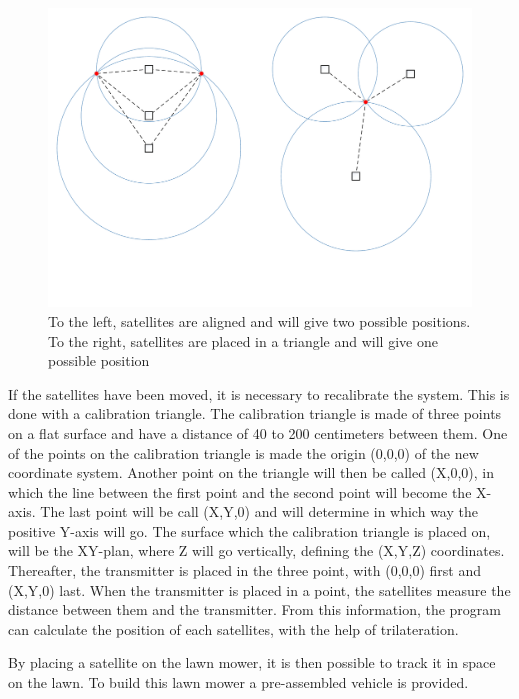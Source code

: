 \begin{figure}[H]
	\centering
	\includegraphics[scale=0.5]{figures/GoT_SingleVsTriangle.pdf}
	\caption{To the left, satellites are aligned and will give two possible positions. To the right, satellites are placed in a triangle and will give one possible position}
	\label{GoTTriVSLine}
\end{figure}
If the satellites have been moved, it is necessary to recalibrate the system. This is done with a calibration triangle. The calibration triangle is made of three points on a flat surface and have a distance of 40 to 200 centimeters between them. One of the points on the calibration triangle is made the origin (0,0,0) of the new coordinate system. Another point on the triangle will then be called (X,0,0), in which the line between the first point and the second point will become the X-axis. The last point will be call (X,Y,0) and will determine in which way the positive Y-axis will go. The surface which the calibration triangle is placed on, will be the XY-plan, where Z will go vertically, defining the (X,Y,Z) coordinates. Thereafter, the transmitter is placed in the three point, with (0,0,0) first and (X,Y,0) last. When the transmitter is placed in a point, the satellites measure the distance between them and the transmitter. From this information, the program can calculate the position of each satellites, with the help of trilateration.

By placing a satellite on the lawn mower, it is then possible to track it in space on the lawn. To build this lawn mower a pre-assembled vehicle is provided.